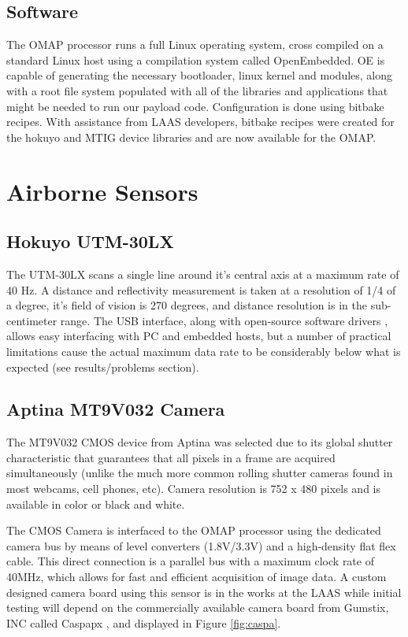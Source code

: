 \documentclass[a4paper,11pt]{report}
\begin{document}
\subsection{Software}

The OMAP processor runs a full Linux operating system, cross compiled on a standard Linux host using a compilation system called OpenEmbedded. OE is capable of generating the necessary bootloader, linux kernel and modules, along with a root file system populated with all of the libraries and applications that might be needed to run our payload code. Configuration is done using bitbake recipes. With assistance from LAAS developers, bitbake recipes were created for the hokuyo and MTIG device libraries and are now available for the OMAP.

\section{Airborne Sensors}

\subsection{Hokuyo UTM-30LX}
\label{Hokuyo}

The UTM-30LX scans a single line around it's central axis at a maximum rate of 40 Hz. A distance and reflectivity measurement is taken at a resolution of 1/4 of a degree, it's field of vision is 270 degrees, and distance resolution is in the sub-centimeter range. The USB interface, along with open-source software drivers \cite{robotpkg}, allows easy interfacing with PC and embedded hosts, but a number of practical limitations cause the actual maximum data rate to be considerably below what is expected (see results/problems section).

\subsection{Aptina MT9V032 Camera}
\label{caspa}

The MT9V032 CMOS device from Aptina was selected due to its global shutter characteristic that guarantees that all pixels in a frame are acquired simultaneously (unlike the much more common rolling shutter cameras found in most webcams, cell phones, etc). Camera resolution is 752 x 480 pixels and is available in color or black and white. 

The CMOS Camera is interfaced to the OMAP processor using the dedicated camera bus by means of level converters (1.8V/3.3V) and a high-density flat flex cable. This direct connection is a parallel bus with a maximum clock rate of 40MHz, which allows for fast and efficient acquisition of image data. A custom designed camera board using this sensor is in the works at the LAAS while initial testing will depend on the commercially available camera board from Gumstix, INC called Caspapx \cite{caspa}, and displayed in Figure \ref{fig:caspa}.
\end{document}

